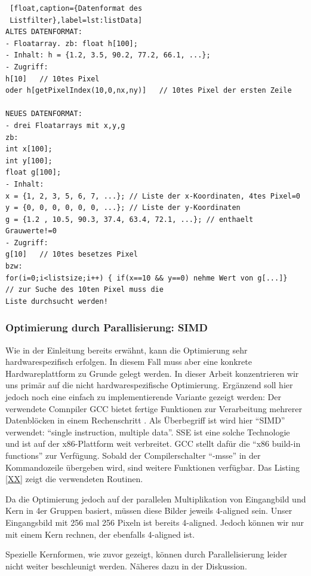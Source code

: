 \documentclass[a4paper,12pt]{article}
\begin{document}
 \begin{lstlisting} [float,caption={Datenformat des
 Listfilter},label=lst:listData] 
ALTES DATENFORMAT:
- Floatarray. zb: float h[100];
- Inhalt: h = {1.2, 3.5, 90.2, 77.2, 66.1, ...};
- Zugriff: 
h[10]	// 10tes Pixel
oder h[getPixelIndex(10,0,nx,ny)]	// 10tes Pixel der ersten Zeile

NEUES DATENFORMAT:
- drei Floatarrays mit x,y,g
zb:
int x[100];
int y[100];
float g[100];
- Inhalt:
x = {1, 2, 3, 5, 6, 7, ...}; // Liste der x-Koordinaten, 4tes Pixel=0
y = {0, 0, 0, 0, 0, 0, ...}; // Liste der y-Koordinaten
g = {1.2 , 10.5, 90.3, 37.4, 63.4, 72.1, ...}; // enthaelt Grauwerte!=0
- Zugriff:
g[10]	// 10tes besetzes Pixel
bzw:
for(i=0;i<listsize;i++) { if(x==10 && y==0) nehme Wert von g[...]}	
// zur Suche des 10ten Pixel muss die
Liste durchsucht werden!

 \end{lstlisting}


\subsubsection{Optimierung durch Parallisierung: SIMD}\label{chp:simd}
Wie in der Einleitung bereits erwähnt, kann die Optimierung sehr
hardwarespezifisch erfolgen. In diesem Fall muss aber eine konkrete
Hardwareplattform zu Grunde gelegt werden. In dieser Arbeit konzentrieren wir
uns primär auf die nicht hardwarespezifische Optimierung. Ergänzend soll hier
jedoch noch eine einfach zu implementierende Variante gezeigt werden: Der
verwendete Comnpiler GCC bietet fertige Funktionen zur Verarbeitung mehrerer
Datenblöcken in einem Rechenschritt \cite{gcc}. Als Überbegriff ist wird hier
"`SIMD"' verwendet: "`single instruction, multiple data"'. SSE ist eine solche
Technologie und ist auf der x86-Plattform weit verbreitet. GCC stellt dafür die
"`x86 build-in functions"' zur Verfügung. Sobald der Compilerschalter "`-msse"'
in der Kommandozeile übergeben wird, sind weitere Funktionen verfügbar. Das
Listing \ref{XX} zeigt die verwendeten Routinen.

Da die Optimierung jedoch auf der parallelen Multiplikation von Eingangbild und
Kern in 4er Gruppen basiert, müssen diese Bilder jeweils 4-aligned sein. Unser
Eingangsbild mit 256 mal 256 Pixeln ist bereits 4-aligned. Jedoch können wir nur
mit einem Kern rechnen, der ebenfalls 4-aligned ist. 

Spezielle Kernformen, wie zuvor gezeigt, können durch Parallelisierung leider
nicht weiter beschleunigt werden. Näheres dazu in der Diskussion.
\end{document}
